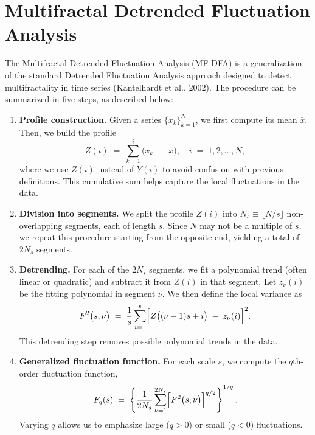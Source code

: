 \documentclass[11pt]{extarticle}
\begin{document}
\section{Multifractal Detrended Fluctuation Analysis}
\label{sec:mfdfa}

The Multifractal Detrended Fluctuation Analysis (MF-DFA) is a generalization of the standard Detrended Fluctuation
Analysis approach designed to detect multifractality in time series (Kantelhardt et al., 2002). The procedure can be summarized in five steps, as described below:

\begin{enumerate}
    \item \textbf{Profile construction.} Given a series \(\{x_k\}_{k=1}^N\), we first compute its mean \(\bar{x}\). Then, we build the profile
    \begin{equation}
        Z(i) \;=\; \sum_{k=1}^{i} \bigl(x_k \;-\; \bar{x}\bigr), \quad i \;=\; 1,2,\dots,N,
    \end{equation}
    where we use \(Z(i)\) instead of \(Y(i)\) to avoid confusion with previous definitions. This cumulative sum helps capture the local fluctuations in the data.

    \item \textbf{Division into segments.} We split the profile \(Z(i)\) into \(N_s \equiv \lfloor N/s \rfloor\) non-overlapping segments, each of length \(s\). Since \(N\) may not be a multiple of \(s\), we repeat this procedure starting from the opposite end, yielding a total of \(2N_s\) segments.

    \item \textbf{Detrending.} For each of the \(2N_s\) segments, we fit a polynomial trend (often linear or quadratic) and subtract it from \(Z(i)\) in that segment. Let \(z_\nu(i)\) be the fitting polynomial in segment \(\nu\). We then define the local variance as
    \begin{equation}
        F^2\bigl(s,\nu\bigr)
        \;=\;
        \frac{1}{s} \sum_{i=1}^s \Bigl[ Z\bigl((\nu-1)s + i\bigr) \;-\; z_\nu(i) \Bigr]^2.
    \end{equation}
    This detrending step removes possible polynomial trends in the data.

    \item \textbf{Generalized fluctuation function.} For each scale \(s\), we compute the \(q\)th-order fluctuation function,
    \begin{equation}
        F_q(s)
        \;=\;
        \left\{
          \frac{1}{2N_s} \sum_{\nu=1}^{2N_s} \Bigl[ F^2\bigl(s,\nu\bigr) \Bigr]^{q/2}
        \right\}^{1/q}.
    \end{equation}
    Varying \(q\) allows us to emphasize large (\(q>0\)) or small (\(q<0\)) fluctuations.


\end{enumerate}
\end{document}
